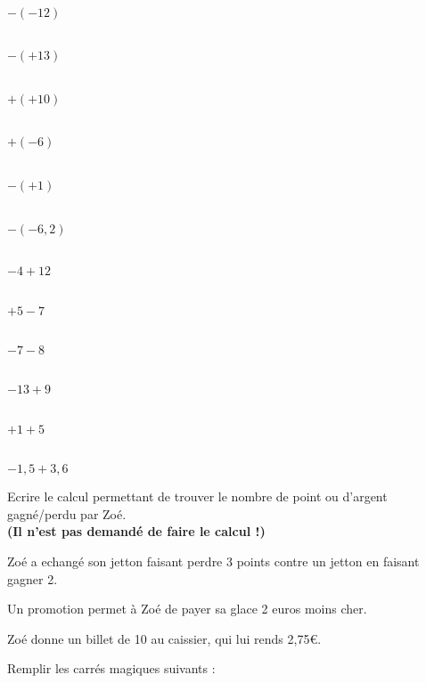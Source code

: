 \begin{multicols}{6}
    \cnt\\ 
    $-(-12)$

    \cnt\\
    $-(+13)$

    \cnt\\
    $+(+10)$

    \cnt\\
    $+(-6)$

    \cnt\\ 
    $-(+1)$

    \cnt\\
    $-(-6,2)$
\end{multicols}
\vspace{1em}
\begin{multicols}{6}
    \cnt\\
    $-4+12$

    \cnt\\
    $+5-7$

    \cnt\\ 
    $-7-8$

    \cnt\\
    $-13+9$

    \cnt\\
    $+1+5$

    \cnt\\
    $-1,5+3,6$
\end{multicols}



Ecrire le calcul permettant de trouver le nombre de point ou d'argent gagné/perdu par Zoé.\\\textbf{(Il n'est pas demandé de faire le calcul !)}

\cnt Zoé a echangé son jetton faisant perdre 3 points contre un jetton en faisant gagner 2.

\cnt Un promotion permet à Zoé de payer sa glace 2 euros moins cher.

\cnt Zoé donne un billet de 10 au caissier, qui lui rends 2,75€.

\newpage


Remplir les carrés magiques suivants :

